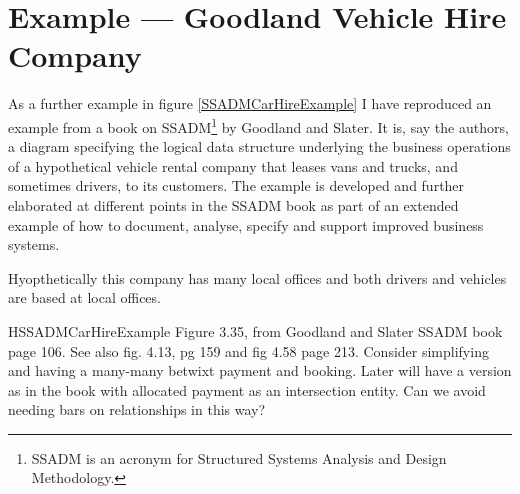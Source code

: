 \section{Example --- Goodland Vehicle Hire Company}
\label{GoodlandVehicleHireCompany}

\mynote As a further example in figure \ref{SSADMCarHireExample}  I have reproduced an example from a book on SSADM\footnote{SSADM is an acronym for Structured Systems Analysis and Design Methodology.} by Goodland and Slater. It is, say the authors, a diagram specifying the logical data structure underlying the business operations of a hypothetical vehicle rental company that leases vans and trucks, and sometimes drivers, to its customers. 
\mynote
The example is developed and further elaborated at different points in the SSADM book as part of an extended example
of how to document, analyse, specify and support improved business systems. 

\mynote Hyopthetically this company has many local offices and both drivers and vehicles are based at local offices. 
\begin{erboxedFigure} {H}{SSADMCarHireExample}{
Figure 3.35, from Goodland and Slater SSADM book page 106. See also fig. 4.13, pg 159 and fig 4.58 page 213.
Consider simplifying and having a many-many betwixt payment and booking. 
Later will have a version as in the book with allocated payment as an intersection entity. 
Can we avoid needing bars on relationships in this way?
}

\begin{center}
\scalebox{0.95}{}
\end{center}
\end{erboxedFigure}